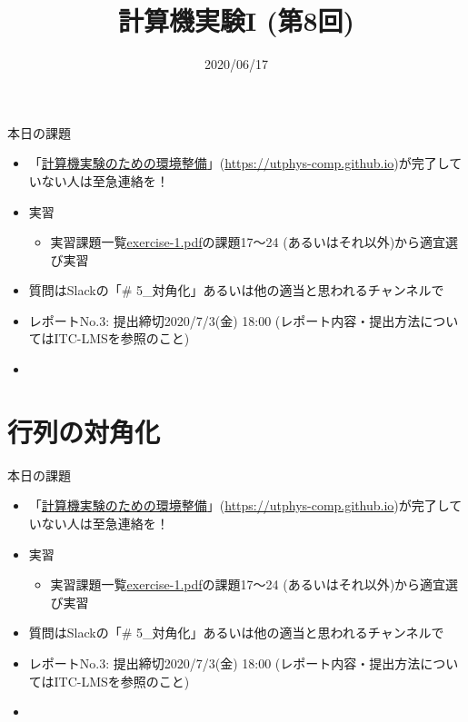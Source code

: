 \documentclass[10pt,dvipdfmx]{beamer}
\title{計算機実験I (第8回)}
\date{2020/06/17}
\begin{document}
\begin{frame}
  \titlepage
  \tableofcontents
\end{frame}

\begin{frame}[t]{本日の課題}
  \begin{itemize}
  \item 「\href{https://utphys-comp.github.io}{計算機実験のための環境整備}」({\small \href{https://utphys-comp.github.io}{https://utphys-comp.github.io}})が完了していない人は至急連絡を！
  \item 実習
    \begin{itemize}
    \item 実習課題一覧\href{https://github.com/todo-group/ComputerExperiments/releases/tag/2020s-computer1}{exercise-1.pdf}の課題17〜24 (あるいはそれ以外)から適宜選び実習
    \end{itemize}
  \item 質問はSlackの「\# 5\_対角化」あるいは他の適当と思われるチャンネルで \\[2em]
  \item レポートNo.3: 提出締切2020/7/3(金) 18:00 (レポート内容・提出方法についてはITC-LMSを参照のこと)
  \item 
  \end{itemize}
\end{frame}

\section{行列の対角化}








\begin{frame}[t]{本日の課題}
  \begin{itemize}
  \item 「\href{https://utphys-comp.github.io}{計算機実験のための環境整備}」({\small \href{https://utphys-comp.github.io}{https://utphys-comp.github.io}})が完了していない人は至急連絡を！
  \item 実習
    \begin{itemize}
    \item 実習課題一覧\href{https://github.com/todo-group/ComputerExperiments/releases/tag/2020s-computer1}{exercise-1.pdf}の課題17〜24 (あるいはそれ以外)から適宜選び実習
    \end{itemize}
  \item 質問はSlackの「\# 5\_対角化」あるいは他の適当と思われるチャンネルで \\[2em]
  \item レポートNo.3: 提出締切2020/7/3(金) 18:00 (レポート内容・提出方法についてはITC-LMSを参照のこと)
  \item 
  \end{itemize}
\end{frame}
\end{document}
